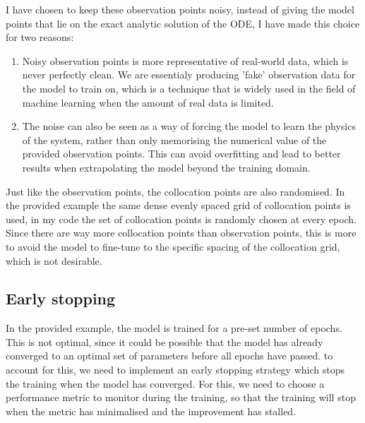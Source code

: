 \documentclass[we,twoside,openright,a4paper,11pt]{uantwerpenbamathesis}
\begin{document}
I have chosen to keep these observation points noisy, instead of giving the model points that lie on the exact analytic solution of the ODE, I have made this choice for two reasons:
\begin{enumerate}
    \item Noisy observation points is more representative of real-world data, which is never perfectly clean. We are essentialy producing 'fake' observation data for the model to train on, which is a technique that is widely used in the field of machine learning when the amount of real data is limited.
    \item The noise can also be seen as a way of forcing the model to learn the physics of the system, rather than only memorising the numerical value of the provided observation points. This can avoid overfitting and lead to better results when extrapolating the model beyond the training domain.
\end{enumerate}

Just like the observation points, the collocation points are also randomised. In the provided example the same dense evenly spaced grid of collocation points is used, in my code the set of collocation points is randomly chosen at every epoch. Since there are way more collocation points than observation points, this is more to avoid the model to fine-tune to the specific spacing of the collocation grid, which is not desirable.

\subsection{Early stopping}
In the provided example, the model is trained for a pre-set number of epochs. This is not optimal, since it could be possible that the model has already converged to an optimal set of parameters before all epochs have passed. to account for this, we need to implement an early stopping strategy which stops the training when the model has converged. For this, we need to choose a performance metric to monitor during the training, so that the training will stop when the metric has minimalised and the improvement has stalled.\\
\end{document}
